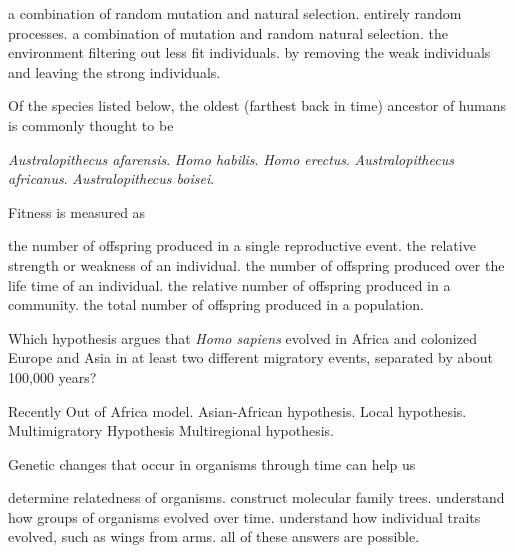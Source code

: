\begin{choices}
\correctchoice a combination of random mutation and natural selection.%
\choice entirely random processes.%
\choice a combination of mutation and random natural selection.%
\choice the environment filtering out less fit individuals.%
\choice by removing the weak individuals and leaving the strong individuals.%
\end{choices}

\question
Of the species listed below, the oldest (farthest back in time) ancestor of humans is commonly thought to be

\begin{choices}
\correctchoice \textit{Australopithecus afarensis}.%
\choice \textit{Homo habilis}.%
\choice \textit{Homo erectus}.%
\choice \textit{Australopithecus africanus}.%
\choice \textit{Australopithecus boisei}.%
\end{choices}

\question
Fitness is measured as

\begin{choices}
\choice the number of offspring produced in a single reproductive event.%
\choice the relative strength or weakness of an individual.%
\correctchoice the number of offspring produced over the life time of an individual.%
\choice the relative number of offspring produced in a community.%
\choice the total number of offspring produced in a population.%
\end{choices}

\question
Which hypothesis argues that \textit{Homo sapiens} evolved in Africa and colonized Europe and Asia in at least two different migratory events, separated by about 100,000 years?

\begin{choices}
\correctchoice Recently Out of Africa model.%
\choice Asian-African hypothesis.%
\choice Local hypothesis.%
\choice Multimigratory Hypothesis%
\choice Multiregional hypothesis.%
\end{choices}

\question
Genetic changes that occur in organisms through time can help us

\begin{choices}
\choice determine relatedness of organisms.%
\choice construct molecular family trees.%
\choice understand how groups of organisms evolved over time.%
\choice understand how individual traits evolved, such as wings from arms.%
\correctchoice all of these answers are possible.%
\end{choices}

